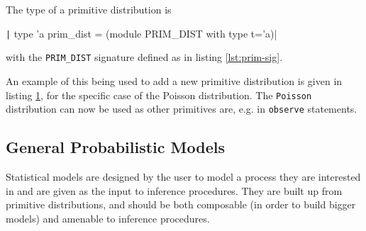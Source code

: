 The type of a primitive distribution is 
\begin{center}
																																																																																																																							
	\texttt| type 'a prim_dist = (module PRIM_DIST with type t='a)|
\end{center}
with the \texttt{PRIM\_DIST} signature defined as in listing \ref{lst:prim-sig}.

\begin{figure}[!htb]
	\begin{minipage}{0.5\textwidth}
		\label{lst:prim-sig}
	\end{minipage}
	\begin{minipage}{0.5\textwidth}
		\label{lst:new-dist}
	\end{minipage}
\end{figure}
	
	
An example of this being used to add a new primitive distribution is given in listing \ref{lst:new-dist}, for the specific case of the Poisson distribution. The \texttt{Poisson} distribution can now be used as other primitives are, e.g. in \texttt{observe} statements.
	
	
\subsection{General Probabilistic Models}
Statistical models are designed by the user to model a process they are interested in and are given as the input to inference procedures. They are built up from primitive distributions, and should be both composable (in order to build bigger models) and amenable to inference procedures.


